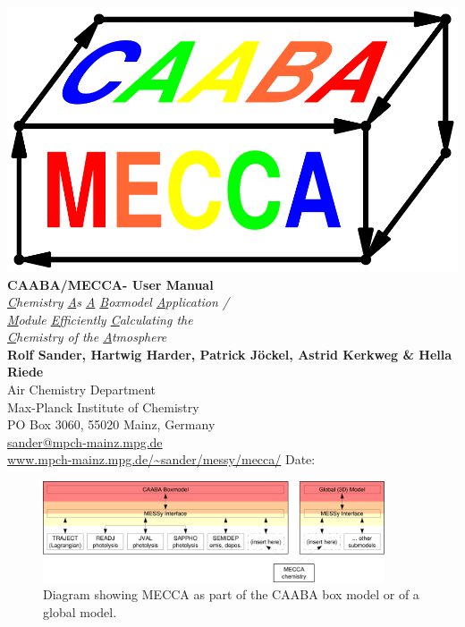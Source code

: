 \documentclass[twoside]{article}
\begin{document}
\thispagestyle{empty}

\begin{center}
  \includegraphics[height=0.3\textheight]{caaba_mecca_logo_print}\\[10mm]
  {\Huge\bf CAABA/MECCA-{\meccaversion} User Manual}\\[10mm]
  {\huge\em \underline{C}hemistry \underline{A}s \underline{A}
    \underline{B}oxmodel \underline{A}pplication /}\\[3mm]
  {\huge\em \underline{M}odule \underline{E}fficiently
    \underline{C}alculating the\\[5mm]
    \underline{C}hemistry of the
    \underline{A}tmosphere}\\[10mm]
  {\huge\bf Rolf Sander, Hartwig Harder, Patrick J\"ockel, Astrid
    Kerkweg \& Hella Riede}\\[15mm]
  \Large
  Air Chemistry Department\\
  Max-Planck Institute of Chemistry\\
  PO Box 3060, 55020 Mainz, Germany\\
  \url{sander@mpch-mainz.mpg.de}\\[10mm]
  {\huge\url{www.mpch-mainz.mpg.de/~sander/messy/mecca/}}
  \vfill
  Date: \thedate
\end{center}

\clearpage

\setlength{\columnsep}{8mm}
\twocolumn\sloppy

\tableofcontents

\begin{figure}%
  \begin{center}
  \includegraphics[width=0.9\textwidth]{modular-mecca}
  \end{center}
  \caption{Diagram showing MECCA as part of the CAABA box model or of a
    global model.}
  \label{fig:modular-mecca}
\end{figure}
\end{document}
